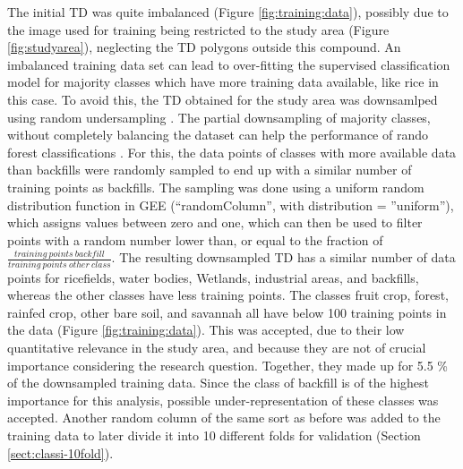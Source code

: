 \documentclass[11pt, A4, oneside]{report}
\begin{document}
The initial TD  was quite imbalanced (Figure \ref{fig:training:data}), possibly due to the image used for training being restricted to the study area (Figure \ref{fig:studyarea}), neglecting the TD polygons outside this compound. An imbalanced training data set can lead to over-fitting the supervised classification model for majority classes which have more training data available, like rice in this case. To avoid this, the TD obtained for the study area was downsamlped using random undersampling \parencite{KrishnaVeni.2011}. The partial downsampling of majority classes, without completely balancing the dataset can help the performance of rando forest classifications \parencite{Hasanin.2018}. For this, the data points of classes with more available data than backfills were randomly sampled to end up with a similar number of training points as backfills. The sampling was done using a uniform random distribution function in GEE (“randomColumn”, with distribution = ”uniform”), which assigns values between zero and one, which can then be used to filter points with a random number lower than, or equal to the fraction of $\frac{training~points~backfill}{training~points~other~class}$. The resulting downsampled TD  has a similar number of data points for ricefields, water bodies, Wetlands, industrial areas, and backfills, whereas the other classes have less training points. The classes fruit crop, forest, rainfed crop, other bare soil, and savannah all have below 100 training points in the data (Figure \ref{fig:training:data}). This was accepted, due to their low quantitative relevance in the study area, and because they are not of crucial importance considering the research question. Together, they made up for 5.5 \% of the downsampled training data. Since the class of backfill is of the highest importance for this analysis, possible under-representation of these classes was accepted. Another random column of the same sort as before was  added to the training data to later divide it into 10 different folds for validation (Section \ref{sect:classi-10fold}).
\end{document}

